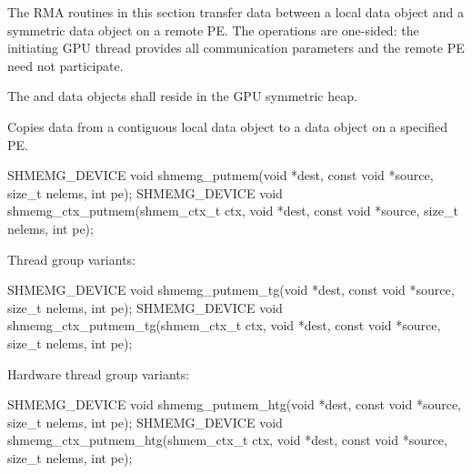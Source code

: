 
The \ac{RMA} routines in this section transfer data between a local data object
and a symmetric data object on a remote \ac{PE}. The operations are one-sided:
the initiating \ac{GPU} thread provides all communication parameters and the
remote \ac{PE} need not participate.

The  and  data objects shall reside in the \ac{GPU}
symmetric heap.

\label{subsec:gc_put}

Copies data from a contiguous local data object to a data object on a specified
\ac{PE}.

\begin{apidefinition}
\begin{Csynopsis}
SHMEMG_DEVICE void shmemg_putmem(void *dest, const void *source,
    size_t nelems, int pe);
SHMEMG_DEVICE void shmemg_ctx_putmem(shmem_ctx_t ctx, void *dest,
    const void *source, size_t nelems, int pe);
\end{Csynopsis}

Thread group variants:
\begin{CsynopsisCol}
SHMEMG_DEVICE void shmemg_putmem_tg(void *dest, const void *source,
    size_t nelems, int pe);
SHMEMG_DEVICE void shmemg_ctx_putmem_tg(shmem_ctx_t ctx, void *dest,
    const void *source, size_t nelems, int pe);
\end{CsynopsisCol}

Hardware thread group variants:
\begin{CsynopsisCol}
SHMEMG_DEVICE void shmemg_putmem_htg(void *dest, const void *source,
    size_t nelems, int pe);
SHMEMG_DEVICE void shmemg_ctx_putmem_htg(shmem_ctx_t ctx, void *dest,
    const void *source, size_t nelems, int pe);
\end{CsynopsisCol}

\begin{apiarguments}
\end{apiarguments}


\end{apidefinition}


